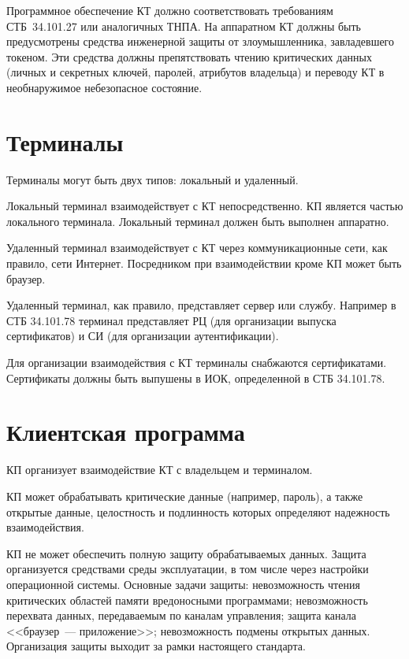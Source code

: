 Программное обеспечение КТ должно соответствовать требованиям СТБ~34.101.27 
или аналогичных ТНПА. На аппаратном КТ должны быть 
предусмотрены средства инженерной защиты от злоумышленника, завладевшего 
токеном. Эти средства должны препятствовать чтению критических данных 
(личных и секретных ключей, паролей, атрибутов владельца) и переводу КТ в 
необнаружимое небезопасное состояние.  

\section{Терминалы}

Терминалы могут быть двух типов: локальный и удаленный.

Локальный терминал взаимодействует с КТ непосредственно. КП является 
частью локального терминала. Локальный терминал должен быть выполнен
аппаратно.

Удаленный терминал взаимодействует с КТ через коммуникационные сети,
как правило, сети Интернет. Посредником при взаимодействии кроме 
КП может быть браузер. 

Удаленный терминал, как правило, представляет сервер или службу.
Например в СТБ 34.101.78 терминал представляет РЦ (для организации 
выпуска сертификатов) и СИ (для организации аутентификации). 

Для организации взаимодействия с КТ терминалы снабжаются сертификатами.
Сертификаты должны быть выпушены в ИОК, определенной в СТБ 34.101.78.

\section{Клиентская программа}

КП организует взаимодействие КТ с владельцем и терминалом.

КП может обрабатывать критические данные
(например, пароль), а также открытые данные, 
целостность и подлинность которых определяют надежность  
взаимодействия.

КП не может обеспечить полную защиту обрабатываемых данных. 
Защита организуется средствами среды эксплуатации, 
в том числе через настройки операционной системы.  
%
Основные задачи защиты: 
невозможность чтения критических областей памяти
вредоносными программами; 
невозможность перехвата данных, передаваемым по каналам управления; 
защита канала <<браузер~--- приложение>>; 
невозможность подмены открытых данных.
%
Организация защиты выходит за рамки настоящего стандарта.

